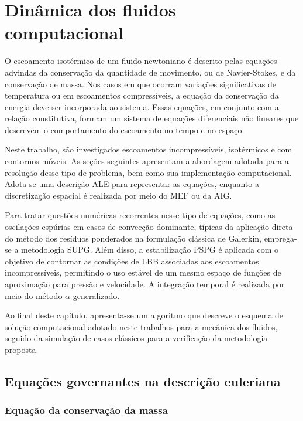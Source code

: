 \chapter[Dinâmica dos fluidos computacional]{Dinâmica dos fluidos computacional}
\label{capitulo:Cap2}

O escoamento isotérmico de um fluido newtoniano é descrito pelas equações advindas da conservação da quantidade de movimento, ou de Navier-Stokes, e da conservação de massa. Nos casos em que ocorram variações significativas de temperatura ou em escoamentos compressíveis, a equação da conservação da energia deve ser incorporada ao sistema. Essas equações, em conjunto com a relação constitutiva, formam um sistema de equações diferenciais não lineares que descrevem o comportamento do escoamento no tempo e no espaço. 

Neste trabalho, são investigados escoamentos incompressíveis, isotérmicos e com contornos móveis. As seções seguintes apresentam a abordagem adotada para a resolução desse tipo de problema, bem como sua implementação computacional. Adota-se uma descrição ALE para representar as equações, enquanto a discretização espacial é realizada por meio do MEF ou da AIG.

Para tratar questões numéricas recorrentes nesse tipo de equações, como as oscilações espúrias em casos de convecção dominante, típicas da aplicação direta do método dos resíduos ponderados na formulação clássica de Galerkin, emprega-se a metodologia SUPG. Além disso, a estabilização PSPG é aplicada com o objetivo de contornar as condições de LBB associadas aos escoamentos incompressíveis, permitindo o uso estável de um mesmo espaço de funções de aproximação para pressão e velocidade. A integração temporal é realizada por meio do método $\alpha$-generalizado.

Ao final deste capítulo, apresenta-se um algoritmo que descreve o esquema de solução computacional adotado neste trabalhos para a mecânica dos fluidos, seguido da simulação de casos clássicos para a verificação da metodologia proposta.

\section{Equações governantes na descrição euleriana} 

\subsection{Equação da conservação da massa}

